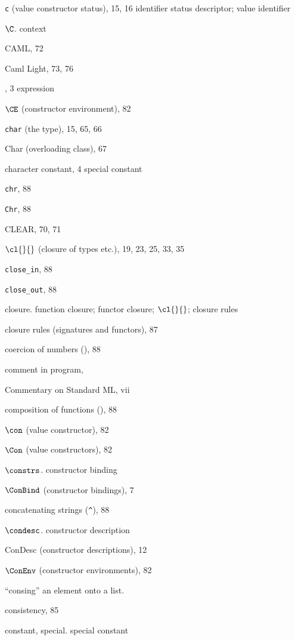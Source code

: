 \begin{theindex}
\item \verb+c+ (value constructor status), 15, 16
\subitem \seealso identifier status descriptor; value identifier
\item $\C$. \see context
\item CAML, 72
\item Caml Light, 73, 76
\item \CASE, 3
\subitem \seealso expression
\item $\CE$ (constructor environment), 82 
\item {\tt char} (the type), 15, 65, 66
\item Char (overloading class), 67
\item character constant, 4
\subitem \seealso special constant
\item {\tt chr}, 88
\item {\tt Chr}, 88
\item CLEAR, 70, 71
\item $\cl{}{}$ (closure of types etc.), 19, 23, 25, 33, 35
\item \verb+close_in+, 88
\item \verb+close_out+, 88
\item closure. \see function closure; functor closure; $\cl{}{}$; closure rules
\item closure rules (signatures and functors), 87
\item coercion of numbers (), 88
\item comment in program, \commentrefs
\item Commentary on Standard ML, vii
\item composition of functions (), 88
\item $\con$ (value constructor), 82
\item $\Con$ (value constructors), 82
\item $\constrs$. \see constructor binding
\item $\ConBind$ (constructor bindings), 7
\item concatenating strings (\verb+^+), 88
\item $\condesc$. \see constructor description
\item ConDesc (constructor descriptions), 12
\item $\ConEnv$ (constructor environments), 82
\item ``consing'' an element onto a list. \see \ml{::}
\item consistency, 85
\item constant, special. \see special constant 

\end{theindex}
